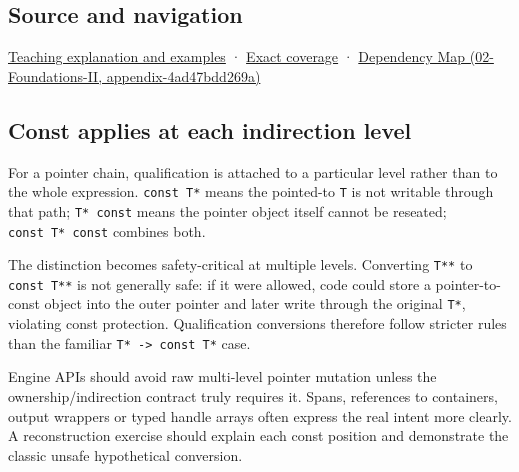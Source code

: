 \subsection{Source and navigation}\label{source-and-navigation}

\href{Continuous\%20Notes/Computing\%20Foundations\%20-\%20From\%20Bits\%20to\%20C++\%20and\%20Systems\%20APIs\#Read-only\%20is\%20a\%20path,\%20not\%20an\%20ownership\%20or\%20synchronization\%20promise}{Teaching explanation and examples} · \hyperref[appendix-fd090d982a15]{Exact coverage} · \href{}{Dependency Map (02-Foundations-II, appendix-4ad47bdd269a)}

\subsection{Const applies at each indirection level}\label{const-applies-at-each-indirection-level}

For a pointer chain, qualification is attached to a particular level rather than to the whole expression. \texttt{const\ T*} means the pointed-to \texttt{T} is not writable through that path; \texttt{T*\ const} means the pointer object itself cannot be reseated; \texttt{const\ T*\ const} combines both.

The distinction becomes safety-critical at multiple levels. Converting \texttt{T**} to \texttt{const\ T**} is not generally safe: if it were allowed, code could store a pointer-to-const object into the outer pointer and later write through the original \texttt{T*}, violating const protection. Qualification conversions therefore follow stricter rules than the familiar \texttt{T*\ -\textgreater{}\ const\ T*} case.

Engine APIs should avoid raw multi-level pointer mutation unless the ownership/indirection contract truly requires it. Spans, references to containers, output wrappers or typed handle arrays often express the real intent more clearly. A reconstruction exercise should explain each const position and demonstrate the classic unsafe hypothetical conversion.
